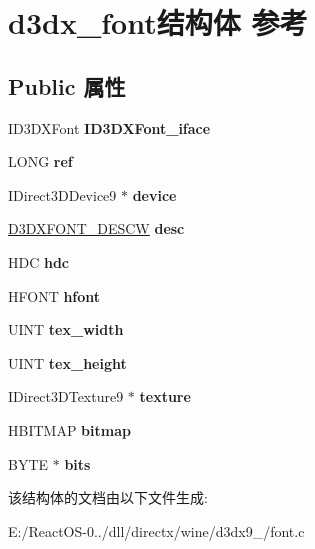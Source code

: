 \hypertarget{structd3dx__font}{}\section{d3dx\+\_\+font结构体 参考}
\label{structd3dx__font}
\subsection*{Public 属性}
\begin{DoxyCompactItemize}
\item 
\mbox{\label{structd3dx__font_a91b20842d5850c345078b0027e0397c8}} 
I\+D3\+D\+X\+Font {\bfseries I\+D3\+D\+X\+Font\+\_\+iface}
\item 
\mbox{\label{structd3dx__font_ad3103c97ccd0bfadcd1cdf4766b7ddb2}} 
L\+O\+NG {\bfseries ref}
\item 
\mbox{\label{structd3dx__font_af0c4c7397bcc6106de0fc42084f3db2a}} 
I\+Direct3\+D\+Device9 $\ast$ {\bfseries device}
\item 
\mbox{\label{structd3dx__font_ab2c0c2cde61425a3f95f37c545b82547}} 
\hyperlink{struct___d3_d_x_f_o_n_t___d_e_s_c_w}{D3\+D\+X\+F\+O\+N\+T\+\_\+\+D\+E\+S\+CW} {\bfseries desc}
\item 
\mbox{\label{structd3dx__font_a9e8456fddf716178f1db8c03b2b0c25e}} 
H\+DC {\bfseries hdc}
\item 
\mbox{\label{structd3dx__font_af8dc42f61df038bfad54b82d0b152ca0}} 
H\+F\+O\+NT {\bfseries hfont}
\item 
\mbox{\label{structd3dx__font_a897a43356e53cfe1c8790b9b2da49d7d}} 
U\+I\+NT {\bfseries tex\+\_\+width}
\item 
\mbox{\label{structd3dx__font_adcfcf6b175b694856ab3925341870e7e}} 
U\+I\+NT {\bfseries tex\+\_\+height}
\item 
\mbox{\label{structd3dx__font_a5475c5eead7994bdd7cb4768d85e0201}} 
I\+Direct3\+D\+Texture9 $\ast$ {\bfseries texture}
\item 
\mbox{\label{structd3dx__font_a65732f01f3677442dd2297ebbde27cd8}} 
H\+B\+I\+T\+M\+AP {\bfseries bitmap}
\item 
\mbox{\label{structd3dx__font_a8a06f501b97796e2d673be90e81f8f57}} 
B\+Y\+TE $\ast$ {\bfseries bits}
\end{DoxyCompactItemize}


该结构体的文档由以下文件生成\+:\begin{DoxyCompactItemize}
\item 
E\+:/\+React\+O\+S-\/0../dll/directx/wine/d3dx9\+\_/font.\+c\end{DoxyCompactItemize}

